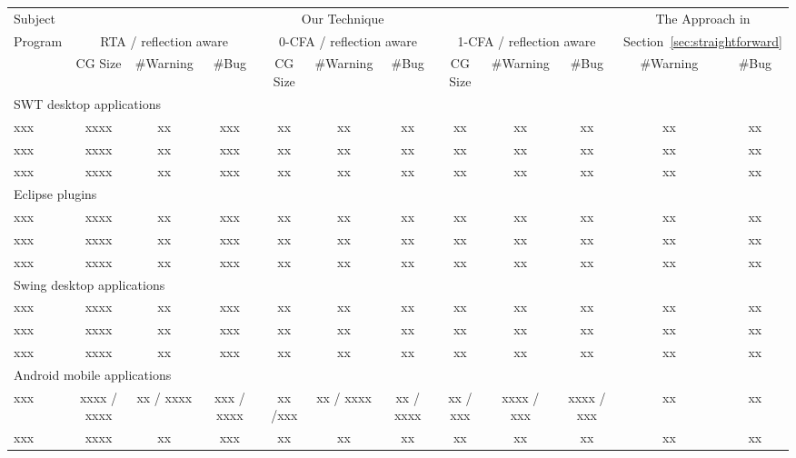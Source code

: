 \begin{table*}[ht]
\begin{center}
 \fontsize{9pt}{\baselineskip}\selectfont
\hspace*{-0.2cm}
\setlength{\tabcolsep}{.75\tabcolsep}
\begin{tabular}{|l||c|c|c||c|c|c||c|c|c||c|c|}
\hline
 Subject&  \multicolumn{9}{|c||}{Our Technique} & \multicolumn{2}{|c|}{The Approach in}  \\
\cline{2-10}
 Program  &  \multicolumn{3}{|c|}{RTA / reflection aware}& \multicolumn{3}{|c|}{0-CFA / reflection aware} & \multicolumn{3}{|c||}{1-CFA / reflection aware} & \multicolumn{2}{|c|}{Section~\ref{sec:straightforward}}  \\
\cline{2-12}
 & CG Size & \#Warning & \#Bug & CG Size & \#Warning & \#Bug & CG Size & \#Warning & \#Bug & \#Warning & \#Bug\\
\hline \hline
\multicolumn{12}{|l|}{SWT desktop applications}   \\
 \hline
 xxx &  xxxx &  xx &  xxx & xx & xx & xx& xx & xx & xx& xx & xx \\
 \hline
 xxx &  xxxx &  xx &  xxx & xx & xx & xx& xx & xx & xx& xx & xx \\
 \hline
 xxx &  xxxx &  xx &  xxx & xx & xx & xx& xx & xx & xx& xx & xx \\
 \hline
 \hline
\multicolumn{12}{|l|}{Eclipse plugins}   \\
 \hline
 xxx &  xxxx &  xx &  xxx & xx & xx & xx& xx & xx & xx& xx & xx \\
 \hline
 xxx &  xxxx &  xx &  xxx & xx & xx & xx& xx & xx & xx& xx & xx \\
 \hline
 xxx &  xxxx &  xx &  xxx & xx & xx & xx& xx & xx & xx& xx & xx \\
 \hline
 \hline
\multicolumn{12}{|l|}{Swing desktop applications}   \\
 \hline
 xxx &  xxxx &  xx &  xxx & xx & xx & xx& xx & xx & xx& xx & xx \\
 \hline
 xxx &  xxxx &  xx &  xxx & xx & xx & xx& xx & xx & xx& xx & xx \\
 \hline
 xxx &  xxxx &  xx &  xxx & xx & xx & xx& xx & xx & xx& xx & xx \\
 \hline
 \hline
\multicolumn{12}{|l|}{Android mobile applications}   \\
 \hline
 xxx &  xxxx / xxxx &  xx / xxxx &  xxx / xxxx & xx /xxx & xx / xxxx  & xx / xxxx& xx / xxx & xxxx / xxx  & xxxx / xxx& xx & xx \\
 \hline
 xxx &  xxxx &  xx &  xxx & xx & xx & xx& xx & xx & xx& xx & xx \\

\end{tabular}
\end{center}
\end{table*}
